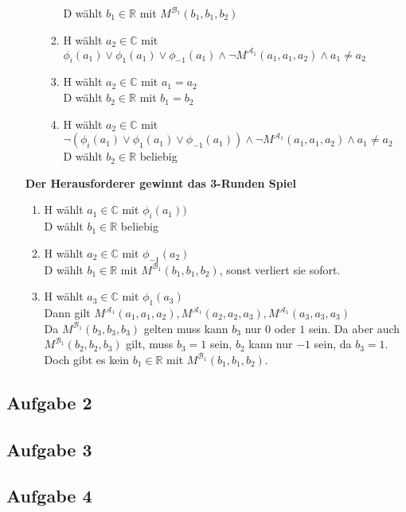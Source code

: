 \documentclass[a4paper,10pt]{article}
\begin{document}
\begin{enumerate}[(i)]
\begin{enumerate}
\begin{enumerate}
					D wählt $b_1 \in \mathbb{R}$ mit $M^{\mathcal{B}_1}(b_1,b_1,b_2)$ 
				\item  	H wählt $a_2 \in \mathbb{C}$ mit $\phi_i(a_1) \lor \phi_1(a_1) \lor \phi_{-1}(a_1) \land \lnot M^{\mathcal{A}_1}(a_1,a_1,a_2) \land a_1 \neq a_2$  
				\item  	H wählt $a_2 \in \mathbb{C}$ mit $a_1 = a_2$ \\
					D wählt $b_2 \in \mathbb{R} $ mit $b_1 = b_2$
				\item  	H wählt $a_2 \in  \mathbb{C}$ mit $\lnot(\phi_i(a_1) \lor \phi_1(a_1) \lor \phi_{-1}(a_1)) \land \lnot M^{\mathcal{A}_1}(a_1,a_1,a_2) \land a_1 \neq a_2$ \\
					D wählt $b_2 \in \mathbb{R}$ beliebig
			\end{enumerate}
		\end{enumerate}
	\textbf{Der Herausforderer gewinnt das 3-Runden Spiel}
		\begin{enumerate}[1. \text{Zug:}]
			\item  	H wählt $a_1 \in \mathbb{C}$ mit $\phi_{i}(a_1))$ \\
				D wählt $b_1 \in \mathbb{R}$ beliebig
			\item 	H wählt $a_2 \in \mathbb{C}$ mit $\phi_{-1}(a_2)$ \\
				D wählt $b_1 \in \mathbb{R}$ mit $M^{\mathcal{B}_1}(b_1,b_1,b_2)$, sonst verliert sie sofort.
			\item  	H wählt $a_3 \in \mathbb{C}$ mit $\phi_{1}(a_3)$ \\
			Dann gilt $M^{\mathcal{A}_1}(a_1,a_1,a_2), M^{\mathcal{A}_1}(a_2,a_2,a_3), M^{\mathcal{A}_1}(a_3,a_3,a_3)$ \\
			Da $M^{\mathcal{B}_1}(b_3,b_3,b_3)$ gelten muss kann $b_3$ nur $0$ oder $1$ sein. Da aber auch $M^{\mathcal{B}_1}(b_2,b_2,b_3)$ gilt, muss $b_3 = 1$ sein, $b_2$ kann nur $-1$ sein, da $b_3 = 1$. Doch gibt es kein $b_1 \in  \mathbb{R}$ mit $M^{\mathcal{B}_1}(b_1,b_1,b_2)$.
			
		\end{enumerate}
\end{enumerate}
\subsection*{Aufgabe 2}

\subsection*{Aufgabe 3}

\subsection*{Aufgabe 4}
\end{document}
